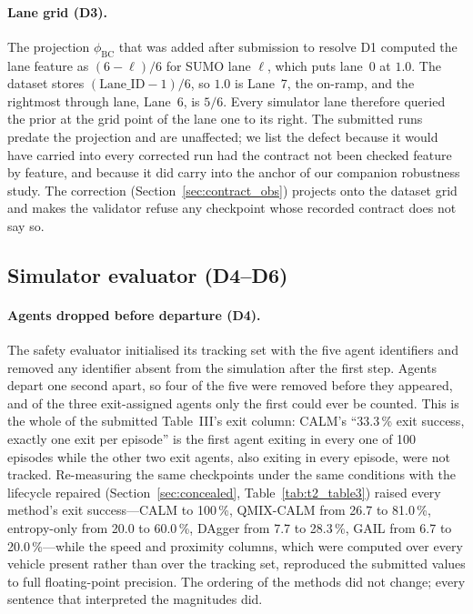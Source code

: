 \paragraph{Lane grid (D3).}
The projection $\phi_{\mathrm{BC}}$ that was added after submission to resolve D1 computed the lane feature as $(6-\ell)/6$ for SUMO lane $\ell$, which puts lane~0 at $1.0$. The dataset stores $(\mathrm{Lane\_ID}-1)/6$, so $1.0$ is Lane~7, the on-ramp, and the rightmost through lane, Lane~6, is $5/6$. Every simulator lane therefore queried the prior at the grid point of the lane one to its right. The submitted runs predate the projection and are unaffected; we list the defect because it would have carried into every corrected run had the contract not been checked feature by feature, and because it did carry into the anchor of our companion robustness study. The correction (Section~\ref{sec:contract_obs}) projects onto the dataset grid and makes the validator refuse any checkpoint whose recorded contract does not say so.

\subsection{Simulator evaluator (D4--D6)}
\label{sec:defects_evaluator}

\paragraph{Agents dropped before departure (D4).}
The safety evaluator initialised its tracking set with the five agent identifiers and removed any identifier absent from the simulation after the first step. Agents depart one second apart, so four of the five were removed before they appeared, and of the three exit-assigned agents only the first could ever be counted. This is the whole of the submitted Table~III's exit column: CALM's ``33.3\,\% exit success, exactly one exit per episode'' is the first agent exiting in every one of 100 episodes while the other two exit agents, also exiting in every episode, were not tracked. Re-measuring the same checkpoints under the same conditions with the lifecycle repaired (Section~\ref{sec:concealed}, Table~\ref{tab:t2_table3}) raised every method's exit success---CALM to 100\,\%, QMIX-CALM from 26.7 to 81.0\,\%, entropy-only from 20.0 to 60.0\,\%, DAgger from 7.7 to 28.3\,\%, GAIL from 6.7 to 20.0\,\%---while the speed and proximity columns, which were computed over every vehicle present rather than over the tracking set, reproduced the submitted values to full floating-point precision. The ordering of the methods did not change; every sentence that interpreted the magnitudes did.

